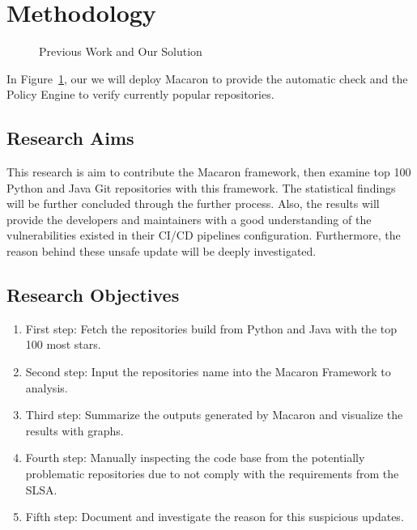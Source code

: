\section{Methodology}

\begin{figure}
    \centering
    \caption{Previous Work and Our Solution}
    \label{Previous Work and Our Solution} 
\end{figure}

In Figure~\ref{Previous Work and Our Solution}, 
our we will deploy Macaron to provide the automatic check and the Policy Engine to verify currently 
popular repositories.  
\subsection{Research Aims}
This research is aim to contribute the Macaron framework, then examine top 100 Python and Java Git 
repositories with this framework. The statistical findings will be further concluded through the further process.
Also, the results will provide the developers and maintainers with a good understanding 
of the vulnerabilities existed in their CI/CD pipelines configuration. Furthermore, the reason behind
these unsafe update will be deeply investigated.

\subsection{Research Objectives}
\begin{enumerate}
    \item First step: Fetch the repositories build from Python and Java with the top 100 most stars.
    \item Second step: Input the repositories name into the Macaron Framework to analysis. 
    \item Third step: Summarize the outputs generated by Macaron and visualize the results with graphs.
    \item Fourth step: Manually inspecting the code base from the potentially problematic repositories 
    due to not comply with the requirements from the SLSA.
    \item Fifth step: Document and investigate the reason for this suspicious updates.  
\end{enumerate}
